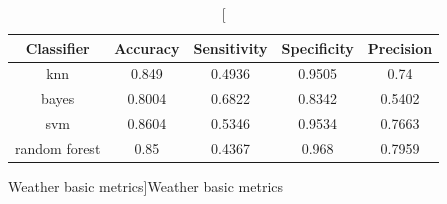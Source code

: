 \documentclass{classrep}
\begin{document}
{{{                \begin{table}[!htbp]
                    \centering
                    \begin{tabular}{|c|c|c|c|c|}
                        \hline
                        Classifier & Accuracy & Sensitivity & Specificity & Precision \\ \hline
                        knn & 0.849 & 0.4936 & 0.9505 & 0.74 \\ \hline
                        bayes & 0.8004 & 0.6822 & 0.8342 & 0.5402 \\ \hline
                        svm & 0.8604 & 0.5346 & 0.9534 & 0.7663 \\ \hline
                        random forest & 0.85 & 0.4367 & 0.968 & 0.7959 \\ \hline
                    \end{tabular}
                    \caption
                    [Weather basic metrics]{Weather basic metrics}
                    \label{Weather_basic_metrics}
                \end{table}
                \FloatBarrier

}}}
\end{document}
